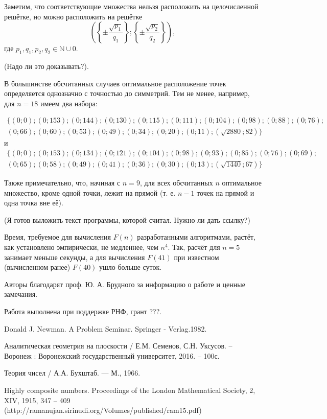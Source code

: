 \documentclass[a4paper,14pt]{article} %
\begin{document}
Заметим, что соответствующие множества нельзя расположить на целочисленной решётке, но можно расположить на решётке 
$$
	\left(
		\left\{\pm\frac{\sqrt{p_1}}{q_1}\right\};
		\left\{\pm\frac{\sqrt{p_2}}{q_2}\right\}
	\right),$$
где $p_1,q_1,p_2,q_2 \in \mathbb{N} \cup{0}$.

(Надо ли это доказывать?).

В большинстве обсчитанных случаев оптимальное расположение точек определяется однозначно с точностью до симметрий.
Тем не менее, например, для $n=18$ имеем два набора:

\begin{multline*}
\{( 0 ; 0 ); ( 0 ; 153 ); ( 0 ; 144 ); ( 0 ; 130 ); ( 0 ; 115 ); ( 0 ; 111 ); ( 0 ; 104 ); ( 0 ; 98 ); ( 0 ; 88 ); ( 0 ; 76 );\\
( 0 ; 66 ); ( 0 ; 60 ); ( 0 ; 53 ); ( 0 ; 49 ); ( 0 ; 34 ); ( 0 ; 20 ); ( 0 ; 11 ); ( \sqrt{2880} ; 82 )\}
\end{multline*}
и
\begin{multline*}
\{( 0 ; 0 ); ( 0 ; 153 ); ( 0 ; 134 ); ( 0 ; 121 ); ( 0 ; 104 ); ( 0 ; 98 ); ( 0 ; 93 ); ( 0 ; 85 ); ( 0 ; 76 ); ( 0 ; 69 );\\
( 0 ; 65 ); ( 0 ; 58 ); ( 0 ; 49 ); ( 0 ; 41 ); ( 0 ; 36 ); ( 0 ; 30 ); ( 0 ; 13 ); ( \sqrt{1440} ; 67 )\}
\end{multline*}


Также примечательно, что, начиная с $n=9$, для всех обсчитанных $n$ оптимальное множество, кроме одной точки, лежит на прямой (т. е. $n-1$ точек на прямой и одна точка вне её).

(Я готов выложить текст программы, которой считал. Нужно ли дать ссылку?)

Время, требуемое для вычисления $F(n)$ разработанными алгоритмами, растёт, как установлено эмпирически, не медленнее, чем $n^4$.
Так, расчёт для $n=5$ занимает меньше секунды, а для вычисления $F(41)$ при известном (вычисленном ранее) $F(40)$ ушло больше суток.

Авторы благодарят проф. Ю. А. Брудного за информацию о работе \cite{Newman} и ценные замечания.

Работа выполнена при поддержке РНФ, грант ???.


\begin{thebibliography}{99}

 Donald J. Newman. A Problem Seminar. Springer - Verlag.1982.

 Аналитическая геометрия на плоскости / Е.М. Семенов, С.Н. Уксусов. – Воронеж : Воронежский государственный университет, 2016. – 100с.

 Теория чисел / А.А. Бухштаб. --- М., 1966.

 Highly composite numbers. Proceedings of the London Mathematical Society, 2, XIV, 1915, 347 – 409 (http://ramanujan.sirinudi.org/Volumes/published/ram15.pdf)

\end{thebibliography}
\end{document}
